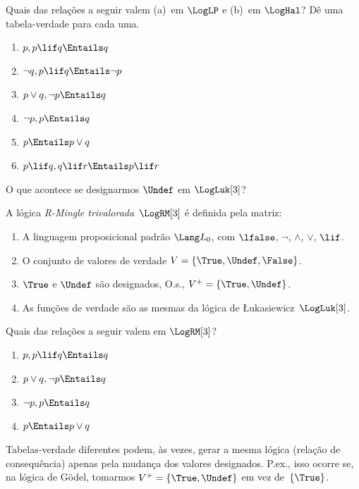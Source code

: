 \documentclass[../../../include/open-logic-section]{subfiles}
\begin{document}
\begin{prob}
  Quais das relações a seguir valem (a)~em $\LogLP$
  e (b)~em $\LogHal$? Dê uma tabela-verdade para cada uma.
  \begin{enumerate}
    \item $p, p \lif q \Entails q$
    \item $\lnot q, p \lif q \Entails \lnot p$
    \item $p \lor q, \lnot p \Entails q$
    \item $\lnot p, p \Entails q$
    \item $p \Entails p \lor q$
    \item $p \lif q, q\lif r \Entails p \lif r$
  \end{enumerate}
\end{prob}

O que acontece se designarmos $\Undef$ em $\LogLuk[3]$?

\begin{defn}
  A lógica \emph{R-Mingle trivalorada}~$\LogRM[3]$ é definida pela matriz:
  \begin{enumerate}
    \item A linguagem proposicional padrão $\Lang L_0$, com
    $\lfalse$, $\lnot$, $\land$, $\lor$, $\lif$.
    \item O conjunto de valores de verdade $V = \{\True, \Undef, \False\}$.
    \item $\True$ e $\Undef$ são designados, O.s.\@, $V^+ = \{\True, \Undef\}$.
    \item As funções de verdade são as mesmas da lógica de \L ukasiewicz~$\LogLuk[3]$.
  \end{enumerate}
\end{defn}

\begin{prob}
  Quais das relações a seguir valem em $\LogRM[3]$?
  \begin{enumerate}
    \item $p, p \lif q \Entails q$
    \item $p \lor q, \lnot p \Entails q$
    \item $\lnot p, p \Entails q$
    \item $p \Entails p \lor q$
  \end{enumerate}
\end{prob}

Tabelas-verdade diferentes podem, às vezes, gerar a mesma lógica
(relação de consequência) apenas pela mudança dos valores designados.
P.ex., isso ocorre se, na lógica de G\"odel, tomarmos $V^+ = \{\True,
\Undef\}$ em vez de~$\{\True\}$.
\end{document}
